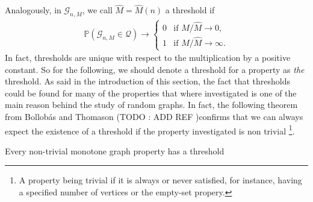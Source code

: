 Analogously, in $\mathcal{G}_{n, M}$, we call $\hat{M} = \hat{M}(n)$ a threshold if
\begin{align}
	\mathbb{P}(\mathcal{G}_{n,M} \in \mathcal{Q}) \rightarrow \left\{\begin{array}{rl}
										0 & \text{if } M / \hat{M} \to 0,\\
										1 & \text{if } M / \hat{M} \to \infty.
									 \end{array}
									\right.
\end{align}
In fact, thresholds are unique with respect to the multiplication by a positive constant. So for the following, we should denote a threshold for a property as \emph{the} threshold.
\newline
As said in the introduction of this section, the fact that thresholds could be found for many of the properties that where investigated is one of the main reason behind the study of random graphs.
In fact, the following theorem from Bollob\'as and Thomason (TODO : ADD REF )confirms that we can always expect the existence of a threshold if the property investigated is non trivial
\footnote{A property being trivial if it is always or never satisfied, for instance, having a specified number of vertices or the empty-set propery.}.
\begin{theorem}
	Every non-trivial monotone graph property has a threshold
\end{theorem}
